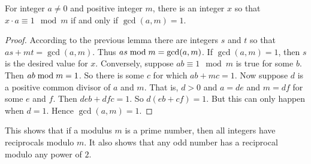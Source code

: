 \begin{thm}
	For integer $a\neq 0$ and positive integer $m$, there is an integer $x$ so that $x\cdot a\equiv 1\mod m$ if and only if $\gcd(a,m)=1$.
	
	\begin{proof}
		According to the previous lemma there are integers $s$ and $t$ so that $as+mt = \gcd(a,m)$. Thus $as\bmod m = \gcd(a,m)$.
		If $\gcd(a,m)=1$, then $s$ is the desired value for $x$.
		Conversely, suppose $ab\equiv 1\mod m$ is true for some $b$. Then
		$ab\bmod m = 1$. So there is some $c$ for which $ab + mc = 1$.
		Now suppose $d$ is a positive common divisor of $a$ and $m$. That is, $d>0$ and
		$a = de$ and $m = df$ for some $e$ and $f$. Then $deb + dfc = 1$. So
		$d(eb + cf) = 1$. But this can only happen when $d=1$. Hence $\gcd(a,m)=1$.
	\end{proof}
\end{thm}

This shows that if a modulus $m$ is a prime number, then all integers have reciprocals modulo $m$. It also shows that any odd number has a reciprocal modulo any power of $2$. 
